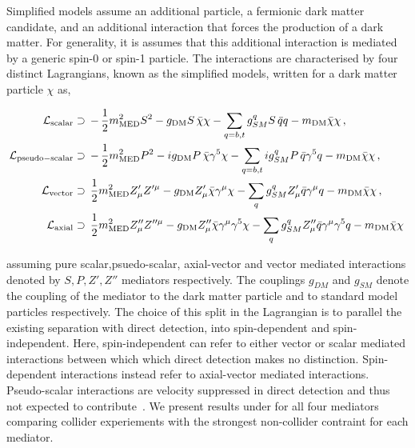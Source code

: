 Simplified models assume an additional particle, a fermionic dark matter candidate, and an additional interaction that forces the production of a dark matter. 
For generality, it is assumes that this additional interaction is mediated by a generic spin-0 or spin-1 particle. 
The interactions are characterised by four distinct Lagrangians, known as the simplified models, written for a dark matter particle $\chi$ as, 

\begin{align}
\label{eq:LS} 
\mathcal{L}_{\mathrm{scalar}}&\supset\, -\,\frac{1}{2}m_{\rm MED}^2 S^2 - g_{\rm DM}  S \, \bar{\chi}\chi
 - \sum_{q=b,t} g_{SM}^q S \, \bar{q}q  - m_{\rm DM} \bar{\chi}\chi \,,
 \\
 \label{eq:LP} 
\mathcal{L}_{\rm{pseudo-scalar}}&\supset\, -\,\frac{1}{2}m_{\rm MED}^2 P^2 - i g_{\rm DM}  P \, \bar{\chi} \gamma^5\chi
 -\sum_{q=b,t}  i g_{SM}^q  P \, \bar{q}  \gamma^5q  - m_{\rm DM} \bar{\chi}\chi\,,
 \\
 \label{eq:LV} 
\mathcal{L}_{\mathrm{vector}}&\supset \, \frac{1}{2}m_{\rm MED}^2 Z'_{\mu} Z'^{\mu} - g_{\rm DM}Z'_{\mu} \bar{\chi}\gamma^{\mu}\chi -\sum_q g_{SM}^q Z'_{\mu} \bar{q}\gamma^{\mu}q - m_{\rm DM} \bar{\chi}\chi\,,
 \\
 \label{eq:LA} 
\mathcal{L}_{\rm{axial}}&\supset\,  \frac{1}{2}m_{\rm MED}^2 Z''_{\mu} Z''^{\mu} - g_{\rm DM} Z''_{\mu} \bar{\chi}\gamma^{\mu}\gamma^5\chi -\sum_q g_{SM}^q Z''_{\mu} \bar{q}\gamma^{\mu}\gamma^5q - m_{\rm DM} \bar{\chi}\chi\,
\end{align}

assuming pure scalar,psuedo-scalar, axial-vector and vector mediated interactions denoted by $S,P,Z',Z''$ mediators respectively. 
The couplings $g_{DM}$ and $g_{SM}$ denote the coupling of the mediator to the dark matter particle and to standard model particles respectively. 
The choice of this split in the Lagrangian is to parallel the existing separation with direct detection, into spin-dependent and spin-independent. 
Here, spin-independent can refer to either vector or scalar mediated interactions between which which direct detection makes no distinction. 
Spin-dependent interactions instead refer to axial-vector mediated interactions. Pseudo-scalar interactions are velocity suppressed in direct detection and thus not expected to contribute~\cite{HaischXXX}. We present results under for all four mediators comparing collider experiements with the strongest non-collider contraint for each mediator.



